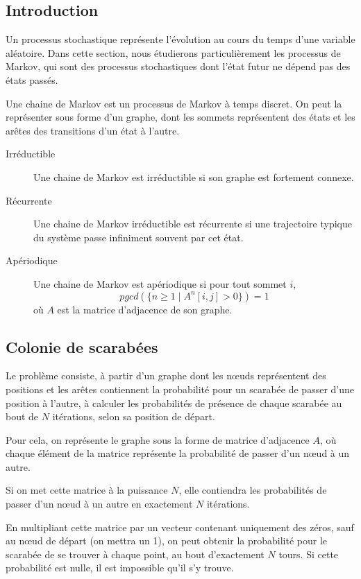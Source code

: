 \subsection{Introduction}
  Un processus stochastique représente l'évolution au cours du temps d'une
  variable aléatoire. Dans cette section, nous étudierons particulièrement les
  processus de Markov, qui sont des processus stochastiques dont l'état futur
  ne dépend pas des états passés.

  Une chaine de Markov est un processus de Markov à temps discret. On
  peut la représenter sous forme d'un graphe, dont les sommets représentent des
  états et les arêtes des transitions d'un état à l'autre.

  \begin{description}
    \item[Irréductible] Une chaine de Markov est irréductible si son graphe est
      fortement connexe.
    \item[Récurrente] Une chaine de Markov irréductible est récurrente si une
      trajectoire typique du système passe infiniment souvent par cet état.
    \item[Apériodique] Une chaine de Markov est apériodique si pour tout sommet $i$,
      \[pgcd(\{ n \geq 1 \mid A^n[i, j] > 0 \}) = 1\] où $A$ est la matrice
      d'adjacence de son graphe.
  \end{description}

\subsection{Colonie de scarabées}
  Le problème consiste, à partir d'un graphe dont les nœuds représentent des
  positions et les arêtes contiennent la probabilité pour un scarabée de passer
  d'une position à l'autre, à calculer les probabilités de présence de chaque
  scarabée au bout de $N$ itérations, selon sa position de départ.

  Pour cela, on représente le graphe sous la forme de matrice d'adjacence $A$, où
  chaque élément de la matrice représente la probabilité de passer d'un nœud à
  un autre.

  Si on met cette matrice à la puissance $N$, elle contiendra les probabilités
  de passer d'un nœud à un autre en exactement $N$ itérations.

  En multipliant cette matrice par un vecteur contenant uniquement des zéros,
  sauf au nœud de départ (on mettra un 1), on peut obtenir la probabilité pour
  le scarabée de se trouver à chaque point, au bout d'exactement $N$ tours.  Si
  cette probabilité est nulle, il est impossible qu'il s'y trouve.

